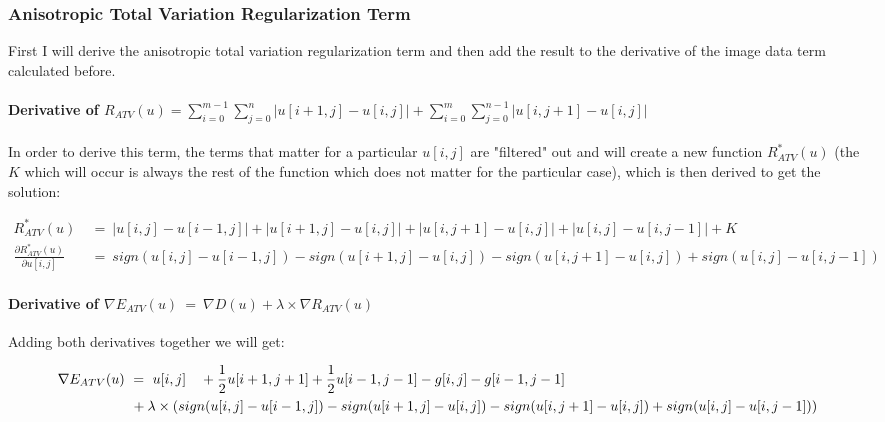 \documentclass{report}
\begin{document}
				\closesection
			\closesection
			\newpage
			\subsubsection{Anisotropic Total Variation Regularization Term}
			\startsubsection
				First I will derive the anisotropic total variation regularization term and then add the result to the derivative of the image data term calculated before.
				\vspace{-0.4cm} \paragraph{Derivative of $R_{ATV}(u) = \sum_{i=0}^{m-1} \sum_{j=0}^{n} | u[i+1,j] - u[i,j] | + \sum_{i=0}^{m} \sum_{j=0}^{n-1} | u[i,j+1] - u[i,j] |$}
				\startsubsection
					\vspace{0.2cm} In order to derive this term, the terms that matter for a particular $u[i,j]$ are "filtered" out and will create a new function $R_{ATV}^*(u)$ (the $K$ which will occur is always the rest of the function which does not matter for the particular case), which is then derived to get the solution:
				\closesection
				\begin{adjustwidth}{-7em}{}
					\vspace{-0.5cm}
					\begin{align*}
						R_{ATV}^*(u) \ & = \ |u[i,j] - u[i-1,j]| + |u[i+1,j] - u[i,j]| + |u[i,j+1] - u[i,j]| + |u[i,j] - u[i,j-1]| + K \\
						\frac{\partial R_{ATV}^*(u)}{\partial u[i,j]} \ & = \ sign(u[i,j] - u[i-1,j]) - sign(u[i+1,j] - u[i,j]) - sign(u[i,j+1] - u[i,j]) + sign(u[i,j] - u[i,j-1])
					\end{align*}
				\end{adjustwidth}
				\vspace{-0.4cm} \paragraph{Derivative of $\nabla E_{ATV}(u) \ = \ \nabla D(u) + \lambda \times \nabla R_{ATV}(u)$}
				\startsubsection
					Adding both derivatives together we will get:
				\closesection
				\begin{adjustwidth}{-6em}{}
						\vspace{-0.5cm}
						\begin{align*}
						\nabla E_{ATV}(u) \ & = \ u[i,j] && + \frac{1}{2} u[i+1,j+1] + \frac{1}{2} u[i-1,j-1] - g[i,j] - g[i-1,j-1] \\
						&&& \hspace{-1.75cm} + \lambda \times (sign(u[i,j] - u[i-1,j]) - sign(u[i+1,j] - u[i,j]) - sign(u[i,j+1] - u[i,j]) + sign(u[i,j] - u[i,j-1]))
					\end{align*}
				\end{adjustwidth}
			\closesection
		\closesection
		
\end{document}
